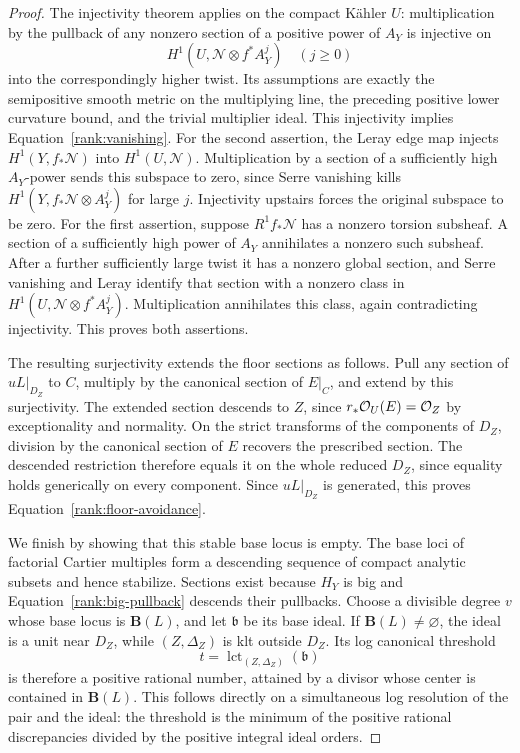 \begin{proof}
The injectivity theorem \cite[Theorem~A]{FujinoMatsumura} applies
on the compact Kähler \(U\): multiplication by the pullback of
any nonzero section of a positive power of \(A_Y\) is injective
on
\[
             H^1(U,\mathscr N\otimes f^*A_Y^j)
             \quad(j\geq0)
\]
into the correspondingly higher twist.  Its assumptions are
exactly the semipositive smooth metric on the multiplying line,
the preceding positive lower curvature bound, and the trivial
multiplier ideal.
This injectivity implies Equation~\eqref{rank:vanishing}.
For the second assertion, the Leray edge map injects
\(H^1(Y,f_*\mathscr N)\) into \(H^1(U,\mathscr N)\).
Multiplication by a section of a sufficiently high \(A_Y\)-power
sends this subspace to zero, since Serre vanishing kills
\(H^1(Y,f_*\mathscr N\otimes A_Y^j)\) for large \(j\).
Injectivity upstairs forces the original subspace to be zero.
For the first assertion, suppose \(R^1f_*\mathscr N\) has a
nonzero torsion subsheaf.  A section of a sufficiently high
power of \(A_Y\) annihilates a nonzero such subsheaf.
After a further sufficiently large twist it has a nonzero
global section, and Serre vanishing and Leray identify that
section with a nonzero class in
\(H^1(U,\mathscr N\otimes f^*A_Y^j)\).
Multiplication annihilates this class, again contradicting
injectivity.  This proves both assertions.

The resulting surjectivity extends the floor sections as follows.
Pull any section of \(uL|_{D_Z}\)
to \(C\), multiply by the canonical section of \(E|_C\), and
extend by this surjectivity.  The extended section descends to
\(Z\), since \(r_*\mathcal O_U(E)=\mathcal O_Z\) by exceptionality and
normality.  On the strict transforms of the components of
\(D_Z\), division by the canonical section of \(E\) recovers
the prescribed section.  The descended restriction therefore
equals it on the whole reduced \(D_Z\), since equality holds
generically on every component.  Since \(uL|_{D_Z}\) is generated,
this proves Equation~\eqref{rank:floor-avoidance}.

We finish by showing that this stable base locus is empty.  The
base loci of factorial Cartier multiples form a descending
sequence of compact analytic subsets and hence stabilize.
Sections exist because \(H_Y\) is big and
Equation~\eqref{rank:big-pullback} descends their pullbacks.
Choose a divisible degree \(v\) whose base locus is
\(\mathbf B(L)\), and let \(\mathfrak b\) be its base ideal.
If \(\mathbf B(L)\ne\varnothing\), the ideal is a unit near
\(D_Z\), while \((Z,\Delta_Z)\) is klt outside \(D_Z\).
Its log canonical threshold
\[
             t=\operatorname{lct}_{(Z,\Delta_Z)}(\mathfrak b)
\]
is therefore a positive rational number, attained by a divisor
whose center is contained in \(\mathbf B(L)\).
This follows directly on a simultaneous log resolution of the
pair and the ideal: the threshold is the minimum of the positive
rational discrepancies divided by the positive integral ideal
orders.


\end{proof}
